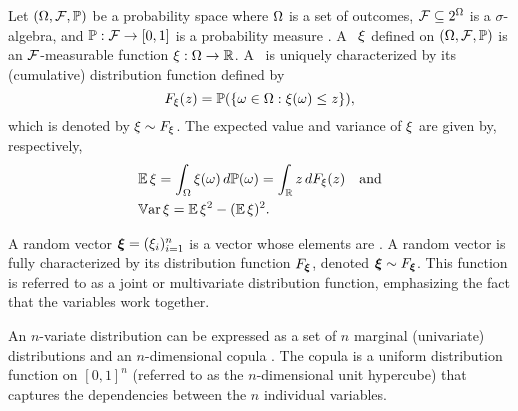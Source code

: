 Let $(\Omega, \mathcal{F}, \mathbb{P})$ be a probability space where $\Omega$ is a set of
outcomes, $\mathcal{F} \subseteq 2^\Omega$ is a $\sigma$-algebra, and
$\mathbb{P}: \mathcal{F} \to [0, 1]$ is a probability measure
\cite{durrett2010}. A \rv\ $\xi$ defined on $(\Omega, \mathcal{F}, \mathbb{P})$ is an
$\mathcal{F}$-measurable function $\xi: \Omega \to \mathbb{R}$. A \rv\ is
uniquely characterized by its (cumulative) distribution function defined by
\begin{equation*}
  F_\xi(z) = \mathbb{P}(\{ \omega \in \Omega: \xi(\omega) \leq z \}),
\end{equation*}
which is denoted by $\xi \sim F_\xi$. The expected value and variance
of $\xi$ are given by, respectively,
\begin{align}
  & \expectation{\h} = \int_\outcomes \h(\o) \, \d\probabilityMeasure(\o) = \int_\real z \, \d\distribution_\h(z) \hspace{1em} \text{and} \elab{expectation} \\
  & \variance{\h} = \expectation{\h^2} - (\expectation{\h})^2. \elab{variance}
\end{align}

A random vector $\bm{\xi} = (\xi_i)_{i = 1}^n$ is a vector whose elements are \rvs. A
random vector is fully characterized by its distribution function
$F_{\bm{\xi}}$, denoted $\bm{\xi} \sim F_{\bm{\xi}}$. This function is
referred to as a joint or multivariate distribution function, emphasizing the
fact that the variables work together.

An $n$-variate distribution can be expressed as a set of $n$ marginal
(univariate) distributions and an $n$-dimensional copula \cite{nelsen2006}. The
copula is a uniform distribution function on $[0, 1]^n$ (referred to as the
$n$-dimensional unit hypercube) that captures the dependencies between the $n$
individual variables.
